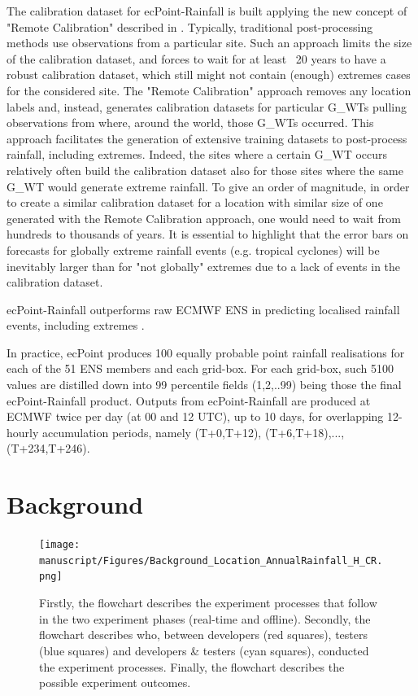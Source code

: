\documentclass[twocol]{ametsocV5} %
\begin{document}
The calibration dataset for ecPoint-Rainfall is built applying the new concept of "Remote Calibration" described in \citet{Hewson2020a}. Typically, traditional post-processing methods use observations from a particular site. Such an approach limits the size of the calibration dataset, and forces to wait for at least ~20 years to have a robust calibration dataset, which still might not contain (enough) extremes cases for the considered site. The "Remote Calibration" approach removes any location labels and, instead, generates calibration datasets for particular G\_WTs pulling observations from where, around the world, those G\_WTs occurred. This approach facilitates the generation of extensive training datasets to post-process rainfall, including extremes. Indeed, the sites where a certain G\_WT occurs relatively often build the calibration dataset also for those sites where the same G\_WT would generate extreme rainfall. To give an order of magnitude, in order to create a similar calibration dataset for a location with similar size of one generated with the Remote Calibration approach, one would need to wait from hundreds to thousands of years. It is essential to highlight that the error bars on forecasts for globally extreme rainfall events (e.g. tropical cyclones) will be inevitably larger than for "not globally" extremes due to a lack of events in the calibration dataset. \par
 ecPoint-Rainfall outperforms raw ECMWF ENS in predicting localised rainfall events, including extremes \citet{Hewson2020a}. \par
In practice, ecPoint produces 100 equally probable point rainfall realisations for each of the 51 ENS members and each grid-box. For each grid-box, such 5100 values are distilled down into 99 percentile fields (1,2,..99) being those the final ecPoint-Rainfall product. Outputs from ecPoint-Rainfall are produced at ECMWF twice per day (at 00 and 12 UTC), up to 10 days, for overlapping 12-hourly accumulation periods, namely (T+0,T+12), (T+6,T+18),...,(T+234,T+246).


\section{Background}
\begin{figure}
\centerline{\texttt{[image: manuscript/Figures/Background\_Location\_AnnualRainfall\_H\_CR.png]}}
\caption{Firstly, the flowchart describes the experiment processes that follow in the two experiment phases (real-time and offline). Secondly, the flowchart describes who, between developers (red squares), testers (blue squares) and developers & testers (cyan squares), conducted the experiment processes. Finally, the flowchart describes the possible experiment outcomes.}
\label{Location_Annual_Rainfall_H_CR}
\end{figure}
\end{document}
